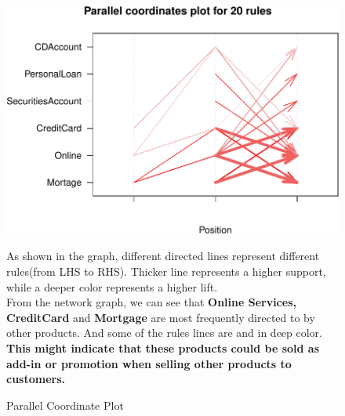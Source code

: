 \documentclass[]{article}
\begin{document}
\begin{figure}[H]
	\centering
	\begin{minipage}{0.58\textwidth}
	\centering
		\includegraphics{tem_files/figure-latex/shopbasket-2.pdf}
		\caption{Parallel Coordinate Plot}
	\end{minipage}
	\hspace{1cm}
	\begin{minipage}{0.28\textwidth}
As shown in the graph, different directed lines represent different rules(from LHS to RHS). Thicker line represents a higher support, while a deeper color represents a higher lift.  \\
From the network graph, we can see that \textbf{Online Services, CreditCard} and \textbf{Mortgage} are most frequently directed to by other products. And some of the rules lines are and in deep color. \textbf{This might indicate that these products could be sold as add-in or promotion when selling other products to customers.}
	\end{minipage}
\end{figure}
\end{document}
